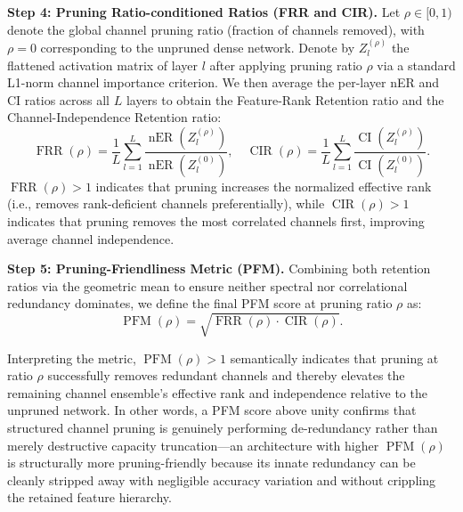 \documentclass[conference]{IEEEtran}
\providecommand{\DIFadd}[1]{{\protect\color{blue}#1}}
\begin{document}
\textbf{Step 4: Pruning Ratio-conditioned Ratios (FRR and CIR).} Let $\rho \in [0, 1)$ denote the global channel pruning ratio (fraction of channels removed), with $\rho = 0$ corresponding to the unpruned dense network. Denote by $Z_l^{(\rho)}$ the flattened activation matrix of layer $l$ after applying pruning ratio $\rho$ via a standard L1-norm channel importance criterion. We then average the per-layer nER and CI ratios across all $L$ layers to obtain the Feature-Rank Retention ratio and the Channel-Independence Retention ratio:
\begin{equation}
\operatorname{FRR}(\rho) = \frac{1}{L} \sum_{l=1}^{L} \frac{\operatorname{nER}(Z_l^{(\rho)})}{\operatorname{nER}(Z_l^{(0)})}, \quad
\operatorname{CIR}(\rho) = \frac{1}{L} \sum_{l=1}^{L} \frac{\operatorname{CI}(Z_l^{(\rho)})}{\operatorname{CI}(Z_l^{(0)})}.
\end{equation}
\DIFadd{$\operatorname{FRR}(\rho) > 1$ indicates that pruning increases the normalized effective rank (i.e., removes rank-deficient channels preferentially), while $\operatorname{CIR}(\rho) > 1$ indicates that pruning removes the most correlated channels first, improving average channel independence.}

\textbf{Step 5: Pruning-Friendliness Metric (PFM).} Combining both retention ratios via the geometric mean to ensure neither spectral nor correlational redundancy dominates, we define the final PFM score at pruning ratio $\rho$ as:
\begin{equation}
\operatorname{PFM}(\rho) = \sqrt{\operatorname{FRR}(\rho) \cdot \operatorname{CIR}(\rho)}.
\end{equation}

\DIFadd{Interpreting the metric, $\operatorname{PFM}(\rho) > 1$ semantically indicates that pruning at ratio $\rho$ successfully removes redundant channels and thereby elevates the remaining channel ensemble's effective rank and independence relative to the unpruned network.} \DIFadd{In other words, a PFM score above unity confirms that structured channel pruning is genuinely performing de-redundancy rather than merely destructive capacity truncation—an architecture with higher $\operatorname{PFM}(\rho)$ is structurally more pruning-friendly because its innate redundancy can be cleanly stripped away with negligible accuracy variation and without crippling the retained feature hierarchy.}
\end{document}
